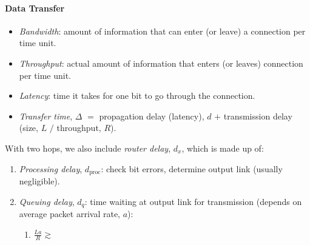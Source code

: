 \documentclass[twocolumn,english]{article}
\begin{document}
\paragraph{Data Transfer}
\begin{itemize}
\item \emph{Bandwidth}: amount of information that can enter (or leave)
a connection per time unit.
\item \emph{Throughput}: actual amount of information that enters (or leaves)
connection per time unit.
\item \emph{Latency}: time it takes for one bit to go through the connection.
\item \emph{Transfer time}, $\Delta$ $=$ propagation delay (latency),
$d$ $+$ transmission delay (size, $L$ $/$ throughput, $R$).
\end{itemize}
With two hops, we also include \emph{router delay}, $d_{x}$, which
is made up of:
\begin{enumerate}
\item \emph{Processing delay}, $d_{\text{proc}}$: check bit errors, determine
output link (usually negligible).
\item \emph{Queuing delay}, $d_{q}$: time waiting at output link for transmission
(depends on average packet arrival rate, $a$):
\begin{enumerate}
\item $\frac{La}{R}\apprge$
\end{enumerate}
\end{enumerate}
\end{document}
